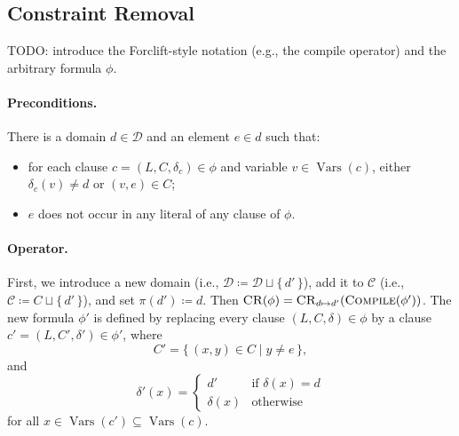 \documentclass{article}
\theoremstyle{definition}
\DeclareMathOperator{\Compile}{\textsc{Compile}}
\DeclareMathOperator{\CR}{\textsc{CR}}
\DeclareMathOperator{\Vars}{Vars}
\begin{document}
\subsection{Constraint Removal}

TODO: introduce the Forclift-style notation (e.g., the compile operator) and the arbitrary formula $\phi$.

\paragraph{Preconditions.} There is a domain $d \in \mathscr{D}$ and an element $e \in d$ such that:
\begin{itemize}
\item for each clause $c = (L, C, \delta_c) \in \phi$ and variable $v \in \Vars(c)$, either $\delta_c(v) \ne d$ or $(v, e) \in C$;
\item $e$ does not occur in any literal of any clause of $\phi$.
\end{itemize}

\paragraph{Operator.} First, we introduce a new domain (i.e., $\mathscr{D} \coloneqq \mathscr{D} \sqcup \{\, d' \,\}$), add it to $\mathscr{C}$ (i.e., $\mathscr{C} \coloneqq C \sqcup \{\, d' \,\}$), and set $\pi(d') \coloneqq d$. Then $\CR(\phi) = \CR_{d \mapsto d'}(\Compile(\phi'))$. The new formula $\phi'$ is defined by replacing every clause $(L, C, \delta) \in \phi$ by a clause $c' = (L, C', \delta') \in \phi'$, where
\[
C' = \{\, (x, y) \in C \mid y \ne e \,\},
\]
and
\[
\delta'(x) =
\begin{cases}
  d' & \text{if } \delta(x) = d \\
  \delta(x) & \text{otherwise}
\end{cases}
\]
for all $x \in \Vars(c') \subseteq \Vars(c)$.
\end{document}
